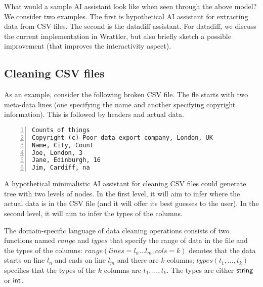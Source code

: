 \documentclass{article}
\begin{document}
What would a sample AI assistant look like when seen through the above model? We consider two
examples. The first is hypothetical AI assistant for extracting data from CSV files. The second
is the datadiff assistant. For datadiff, we discuss the current implementation in Wrattler, but
also briefly sketch a possible improvement (that improves the interactivity aspect).

\subsection{Cleaning CSV files}

As an example, consider the following broken CSV file. The fle starts with two meta-data lines
(one specifying the name and another specifying copyright information). This is followed by headers
and actual data.

\begin{Verbatim}[numbers=left,xleftmargin=8mm]
Counts of things
Copyright (c) Poor data export company, London, UK
Name, City, Count
Joe, London, 3
Jane, Edinburgh, 16
Jim, Cardiff, na
\end{Verbatim}

A hypothetical minimalistic AI assistant for cleaning CSV files could generate tree with two
levels of nodes. In the first level, it will aim to infer where the actual data is in the CSV
file (and it will offer its best guesses to the user). In the second level, it will aim to infer
the types of the columns. 

The domain-specific language of data cleaning operations consists of two functions named
$\mathit{range}$ and $\mathit{types}$ that specify the range of data in the file and the types
of the columns: $\mathit{range}(\mathit{lines}=l_n\ldots l_m, \mathit{cols}=k)$ denotes that
the data starts on line $l_n$ and ends on line $l_m$ and there are $k$ columns; 
$\mathit{types}(t_1,\ldots, t_k)$ specifies that the types of the $k$ columns are 
$t_1, \ldots, t_k$. The types are either $\textnormal{\sffamily string}$ or $\textnormal{\sffamily int}$.
\end{document}
